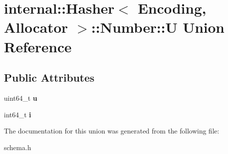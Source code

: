 \hypertarget{a00323}{}\section{internal\+:\+:Hasher$<$ Encoding, Allocator $>$\+:\+:Number\+:\+:U Union Reference}
\label{a00323}
\subsection*{Public Attributes}
\begin{DoxyCompactItemize}
\item 
uint64\+\_\+t {\bfseries u}\hypertarget{a00323_a6380a48b72a4bb5dd7291d47814e6421}{}\label{a00323_a6380a48b72a4bb5dd7291d47814e6421}

\item 
int64\+\_\+t {\bfseries i}\hypertarget{a00323_a19099b91768e67f02ed5a27fc157974b}{}\label{a00323_a19099b91768e67f02ed5a27fc157974b}

\end{DoxyCompactItemize}


The documentation for this union was generated from the following file\+:\begin{DoxyCompactItemize}
\item 
schema.\+h\end{DoxyCompactItemize}
